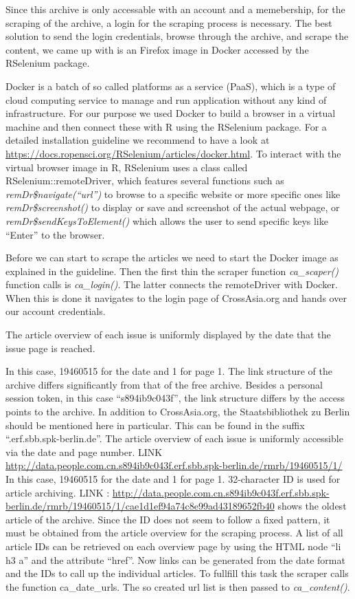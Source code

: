 \documentclass[12pt,a4paper]{article}
\begin{document}
Since this archive is only accessable with an account and a memebership, for the scraping of the archive, a login for the scraping process is necessary. The best solution to send the login credentials, browse through the archive, and scrape the content, we came up with is an Firefox image in Docker accessed by the RSelenium package.

Docker is a batch of so called platforms as a service (PaaS), which is a type of cloud computing service to manage and run application without any kind of infrastructure. For our purpose we used Docker to build a browser in a virtual machine and then connect these with R using the RSelenium package. For a detailed installation guideline we recommend to have a look at \url{https://docs.ropensci.org/RSelenium/articles/docker.html}. To interact with the virtual browser image in R, RSelenium uses a class called RSelenium::remoteDriver, which features several functions such as \emph{remDr\$navigate(``url'')} to browse to a specific website or more specific ones like \emph{remDr\$screenshot()} to display or save and screenshot of the actual webpage, or \emph{remDr\$sendKeysToElement()} which allows the user to send specific keys like ``Enter'' to the browser.

Before we can start to scrape the articles we need to start the Docker image as explained in the guideline. Then the first thin the scraper function \emph{ca\_scaper()} function calls is \emph{ca\_login()}. The latter connects the remoteDriver with Docker. When this is done it navigates to the login page of CrossAsia.org and hands over our account credentials.

The article overview of each issue is uniformly displayed by the date that the issue page is reached.

In this case, 19460515 for the date and 1 for page 1. The link structure of the archive differs significantly from that of the free archive. Besides a personal session token, in this case ``s894ib9c043f'', the link structure differs by the access points to the archive. In addition to CrossAsia.org, the Staatsbibliothek zu Berlin should be mentioned here in particular. This can be found in the suffix ``.erf.sbb.spk-berlin.de''. The article overview of each issue is uniformly accessible via the date and page number.
LINK \url{http://data.people.com.cn.s894ib9c043f.erf.sbb.spk-berlin.de/rmrb/19460515/1/}
In this case, 19460515 for the date and 1 for page 1. 32-character ID is used for article archiving. LINK : \url{http://data.people.com.cn.s894ib9c043f.erf.sbb.spk-berlin.de/rmrb/19460515/1/cae1d1ef94a74c8e99ad43189652fb40} shows the oldest article of the archive. Since the ID does not seem to follow a fixed pattern, it must be obtained from the article overview for the scraping process. A list of all article IDs can be retrieved on each overview page by using the HTML node ``li h3 a'' and the attribute ``href''. Now links can be generated from the date format and the IDs to call up the individual articles. To fullfill this task the scraper calls the function ca\_date\_urls. The so created url list is then passed to \emph{ca\_content()}.
\end{document}
